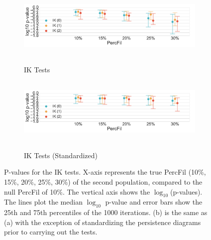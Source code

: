 \documentclass[12pt]{article}
\begin{document}
\begin{figure}[htp!]
  \centering
  \begin{subfigure}{.75\textwidth}
    \centering
    \caption{IK Tests}
    \includegraphics[height = 1.25in]{figure_8_contour_group.pdf}
    \label{fig:sub_contour}
  \end{subfigure}
  \begin{subfigure}{.75\textwidth}
    \centering
    \caption{IK Tests (Standardized)}
    \includegraphics[height = 1.25in]{figure_8_contour_group_normed.pdf}
    \label{fig:sub_contour_normed}
  \end{subfigure}
\label{fig:sub_contour_results}
\caption{P-values for the IK tests. X-axis represents the true PercFil (10\%, 15\%, 20\%, 25\%, 30\%) of the second population, compared to the null PercFil of 10\%.
The vertical axis shows the $\log_{10}$(p-values). The lines plot the median $\log_{10}$ p-value and error bars show the 25th and 75th percentiles of the 1000 iterations. (b) is the same as (a) with the exception of standardizing the persistence diagrams prior to carrying out the tests. }
\end{figure}
\end{document}
